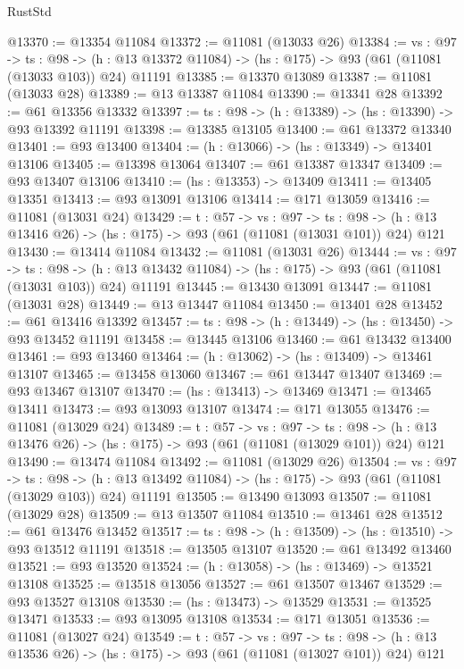 \begin{lexlean}{RustStd}
\begin{coremodule}
@13370 := @13354 @11084
@13372 := @11081 (@13033 @26)
@13384 := {vs : @97} ->
  {ts : @98} ->
  (h : @13 @13372 @11084) -> (hs : @175) -> @93 (@61 (@11081 (@13033 @103)) @24) @11191
@13385 := @13370 @13089
@13387 := @11081 (@13033 @28)
@13389 := @13 @13387 @11084
@13390 := @13341 @28
@13392 := @61 @13356 @13332
@13397 := {ts : @98} -> (h : @13389) -> (hs : @13390) -> @93 @13392 @11191
@13398 := @13385 @13105
@13400 := @61 @13372 @13340
@13401 := @93 @13400
@13404 := (h : @13066) -> (hs : @13349) -> @13401 @13106
@13405 := @13398 @13064
@13407 := @61 @13387 @13347
@13409 := @93 @13407 @13106
@13410 := (hs : @13353) -> @13409
@13411 := @13405 @13351
@13413 := @93 @13091 @13106
@13414 := @171 @13059
@13416 := @11081 (@13031 @24)
@13429 := {t : @57} ->
  {vs : @97} ->
  {ts : @98} -> (h : @13 @13416 @26) -> (hs : @175) -> @93 (@61 (@11081 (@13031 @101)) @24) @121
@13430 := @13414 @11084
@13432 := @11081 (@13031 @26)
@13444 := {vs : @97} ->
  {ts : @98} ->
  (h : @13 @13432 @11084) -> (hs : @175) -> @93 (@61 (@11081 (@13031 @103)) @24) @11191
@13445 := @13430 @13091
@13447 := @11081 (@13031 @28)
@13449 := @13 @13447 @11084
@13450 := @13401 @28
@13452 := @61 @13416 @13392
@13457 := {ts : @98} -> (h : @13449) -> (hs : @13450) -> @93 @13452 @11191
@13458 := @13445 @13106
@13460 := @61 @13432 @13400
@13461 := @93 @13460
@13464 := (h : @13062) -> (hs : @13409) -> @13461 @13107
@13465 := @13458 @13060
@13467 := @61 @13447 @13407
@13469 := @93 @13467 @13107
@13470 := (hs : @13413) -> @13469
@13471 := @13465 @13411
@13473 := @93 @13093 @13107
@13474 := @171 @13055
@13476 := @11081 (@13029 @24)
@13489 := {t : @57} ->
  {vs : @97} ->
  {ts : @98} -> (h : @13 @13476 @26) -> (hs : @175) -> @93 (@61 (@11081 (@13029 @101)) @24) @121
@13490 := @13474 @11084
@13492 := @11081 (@13029 @26)
@13504 := {vs : @97} ->
  {ts : @98} ->
  (h : @13 @13492 @11084) -> (hs : @175) -> @93 (@61 (@11081 (@13029 @103)) @24) @11191
@13505 := @13490 @13093
@13507 := @11081 (@13029 @28)
@13509 := @13 @13507 @11084
@13510 := @13461 @28
@13512 := @61 @13476 @13452
@13517 := {ts : @98} -> (h : @13509) -> (hs : @13510) -> @93 @13512 @11191
@13518 := @13505 @13107
@13520 := @61 @13492 @13460
@13521 := @93 @13520
@13524 := (h : @13058) -> (hs : @13469) -> @13521 @13108
@13525 := @13518 @13056
@13527 := @61 @13507 @13467
@13529 := @93 @13527 @13108
@13530 := (hs : @13473) -> @13529
@13531 := @13525 @13471
@13533 := @93 @13095 @13108
@13534 := @171 @13051
@13536 := @11081 (@13027 @24)
@13549 := {t : @57} ->
  {vs : @97} ->
  {ts : @98} -> (h : @13 @13536 @26) -> (hs : @175) -> @93 (@61 (@11081 (@13027 @101)) @24) @121

\end{coremodule}
\end{lexlean}
